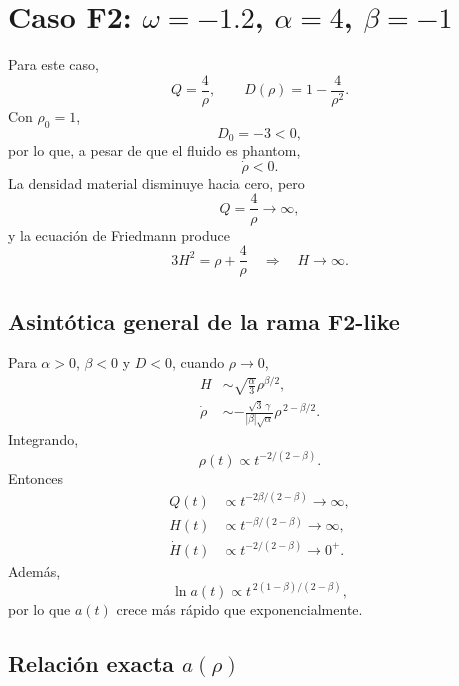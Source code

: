 \documentclass[11pt,a4paper]{article}
\begin{document}
\section{Caso F2: $\omega=-1.2$, $\alpha=4$, $\beta=-1$}

Para este caso,
\begin{equation}
    Q=\frac{4}{\rho},
    \qquad
    D(\rho)=1-\frac{4}{\rho^2}.
\end{equation}
Con $\rho_0=1$,
\[
D_0=-3<0,
\]
por lo que, a pesar de que el fluido es phantom,
\begin{equation}
    \boxed{\dot\rho<0}.
\end{equation}
La densidad material disminuye hacia cero, pero
\begin{equation}
    Q=\frac4\rho\to\infty,
\end{equation}
y la ecuación de Friedmann produce
\begin{equation}
    3H^2=\rho+\frac4\rho
    \quad\Longrightarrow\quad
    H\to\infty.
\end{equation}

\subsection{Asintótica general de la rama F2-like}

Para $\alpha>0$, $\beta<0$ y $D<0$, cuando $\rho\to0$,
\begin{align}
    H&\sim
    \sqrt{\frac{\alpha}{3}}\rho^{\beta/2},\\
    \dot\rho
    &\sim
    -\frac{\sqrt3\,\gamma}
    {|\beta|\sqrt{\alpha}}
    \rho^{\,2-\beta/2}.
\end{align}
Integrando,
\begin{equation}
    \rho(t)\propto
    t^{-2/(2-\beta)}.
\end{equation}
Entonces
\begin{align}
    Q(t)&\propto
    t^{-2\beta/(2-\beta)}
    \longrightarrow\infty,\\
    H(t)&\propto
    t^{-\beta/(2-\beta)}
    \longrightarrow\infty,\\
    \dot H(t)&\propto
    t^{-2/(2-\beta)}
    \longrightarrow0^+.
\end{align}
Además,
\begin{equation}
    \ln a(t)
    \propto
    t^{\,2(1-\beta)/(2-\beta)},
\end{equation}
por lo que $a(t)$ crece más rápido que exponencialmente.

\subsection{Relación exacta $a(\rho)$}
\end{document}
